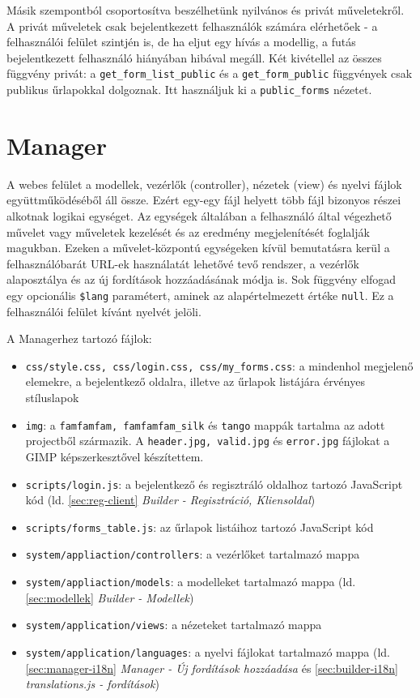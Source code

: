\documentclass[12pt,a4paper,twoside]{article}
\newcommand{\fitem}[1]{\item \texttt{#1}:}
\begin{document}
Másik szempontból csoportosítva beszélhetünk nyilvános és privát műveletekről. A
privát műveletek csak bejelentkezett felhasználók számára elérhetőek - a
felhasználói felület szintjén is, de ha eljut egy hívás a modellig,
a futás bejelentkezett felhasználó hiányában hibával megáll. Két kivétellel az
összes függvény privát: a \texttt{get\_form\_list\_public} és a
\texttt{get\_form\_public} függvények csak publikus űrlapokkal dolgoznak. Itt
használjuk ki a \texttt{public\_forms} nézetet.


\section{Manager}

A webes felület a modellek, vezérlők (controller), nézetek (view) és nyelvi fájlok
együttműködéséből áll össze. Ezért egy-egy fájl helyett több fájl bizonyos
részei alkotnak logikai egységet. Az egységek általában a felhasználó által
végezhető művelet vagy műveletek kezelését és az eredmény megjelenítését foglalják
magukban. Ezeken a művelet-központú egységeken kívül bemutatásra kerül a
felhasználóbarát URL-ek használatát lehetővé tevő rendszer, a vezérlők alaposztálya
és az új fordítások hozzáadásának módja is. Sok függvény elfogad egy opcionális
\texttt{\$lang} paramétert, aminek az alapértelmezett értéke \texttt{null}. Ez a
felhasználói felület kívánt nyelvét jelöli.

A Managerhez tartozó fájlok:

\begin{itemize}
\fitem{css/style.css, css/login.css, css/my\_forms.css} a mindenhol
  megjelenő elemekre, a bejelentkező oldalra, illetve az űrlapok listájára
  érvényes stíluslapok
\fitem{img} a \texttt{famfamfam, famfamfam\_silk} és \texttt{tango}
  mappák tartalma az adott projectből származik. A \texttt{header.jpg,
    valid.jpg} és \texttt{error.jpg} fájlokat a GIMP képszerkesztővel
  készítettem.
\fitem{scripts/login.js} a bejelentkező és regisztráló oldalhoz tartozó
  JavaScript kód (ld. \ref{sec:reg-client} \textit{Builder - Regisztráció,
    Kliensoldal})
\fitem{scripts/forms\_table.js} az űrlapok listáihoz tartozó JavaScript kód
\fitem{system/appliaction/controllers} a vezérlőket tartalmazó mappa
\fitem{system/appliaction/models} a modelleket tartalmazó mappa
(ld. \ref{sec:modellek} \textit{Builder - Modellek})
\fitem{system/application/views} a nézeteket tartalmazó mappa
\fitem{system/application/languages} a nyelvi fájlokat tartalmazó mappa
  (ld. \ref{sec:manager-i18n} \textit{Manager - Új fordítások hozzáadása} és
  \ref{sec:builder-i18n} \textit{translations.js - fordítások})
\end{itemize}
\end{document}
